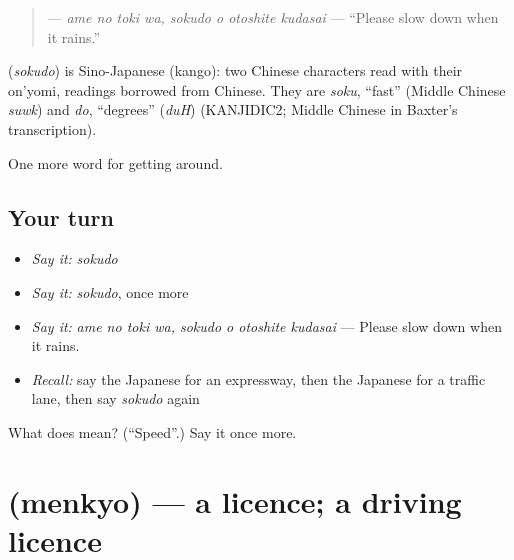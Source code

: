 \begin{quote}
\textbf{   } — \emph{ame no toki wa, sokudo o otoshite kudasai} — \textquotedblleft{}Please slow down when it rains.\textquotedblright{}
\end{quote}

\begin{cousinweb}
\textbf{} (\emph{sokudo}) is Sino-Japanese (kango): two Chinese characters read with their on'yomi, readings borrowed from Chinese. They are \emph{soku}, \textquotedblleft{}fast\textquotedblright{} (Middle Chinese \emph{suwk}) and \emph{do}, \textquotedblleft{}degrees\textquotedblright{} (\emph{duH}) (KANJIDIC2; Middle Chinese in Baxter's transcription).
\end{cousinweb}

\begin{grammarlens}[title={What you've built}]
One more word for getting around.
\end{grammarlens}

\subsection*{Your turn}
\begin{itemize}
\raggedright
  \item \emph{Say it:} \emph{sokudo}
  \item \emph{Say it:} \emph{sokudo}, once more
  \item \emph{Say it:} \emph{ame no toki wa, sokudo o otoshite kudasai} — Please slow down when it rains.
  \item \emph{Recall:} say the Japanese for an expressway, then the Japanese for a traffic lane, then say \emph{sokudo} again
\end{itemize}

\begin{tcolorbox}[breakable,colback=teal!4,colframe=teal!35!black,title={Before you move on}]
What does  mean? (\textquotedblleft{}Speed\textquotedblright{}.) Say it once more.
\end{tcolorbox}
\section[\texorpdfstring{\ja{めんきょ} (menkyo)}{めんきょ (menkyo)}]{ (menkyo) — a licence; a driving licence}

\label{lesson:JA-C390-menkyo}



